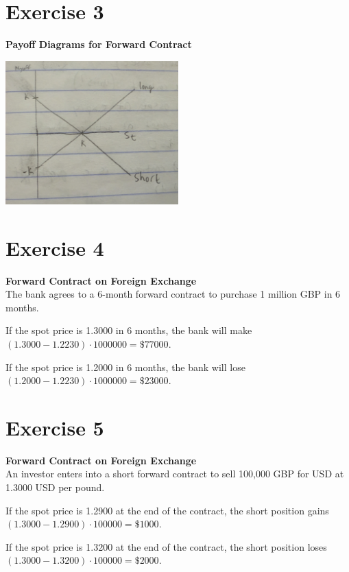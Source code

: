 \documentclass{article}
\begin{document}
\section*{Exercise 3}
\begin{flushleft}
    \textbf{Payoff Diagrams for Forward Contract}
\end{flushleft}
\begin{center}
    \includegraphics[width=0.5\textwidth]{ex3.jpg}
\end{center}

\section*{Exercise 4}
\begin{flushleft}
    \textbf{Forward Contract on Foreign Exchange} \\
    The bank agrees to a 6-month forward contract to purchase 1 million GBP in 6 months.
    \begin{list}{}
        \item If the spot price is 1.3000 in 6 months, the bank will make $(1.3000 - 1.2230) \cdot 1000000 = \$77000$.
        \item If the spot price is 1.2000 in 6 months, the bank will lose $(1.2000 - 1.2230) \cdot 1000000 = \$23000$.
    \end{list}
\end{flushleft}

\section*{Exercise 5}
\begin{flushleft}
    \textbf{Forward Contract on Foreign Exchange} \\
    An investor enters into a short forward contract to sell 100,000 GBP for USD at 1.3000 USD per pound.
    \begin{list}{}
        \item If the spot price is 1.2900 at the end of the contract, the short position gains $(1.3000 - 1.2900) \cdot 100000 = \$1000$.
        \item If the spot price is 1.3200 at the end of the contract, the short position loses $(1.3000 - 1.3200) \cdot 100000 = \$2000$.
    \end{list}
\end{flushleft}
\end{document}
